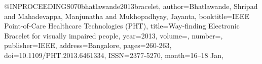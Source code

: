 @INPROCEEDINGS{070bhatlawande2013bracelet,
author={Bhatlawande, Shripad and Mahadevappa, Manjunatha and Mukhopadhyay, Jayanta},
booktitle={IEEE Point-of-Care Healthcare Technologies (PHT)}, 
title={Way-finding Electronic Bracelet for visually impaired people}, 
year={2013},
volume={},
number={},
publisher={IEEE},
address={Bangalore},
pages={260-263},
doi={10.1109/PHT.2013.6461334},
ISSN={2377-5270},
month={16--18 Jan},}